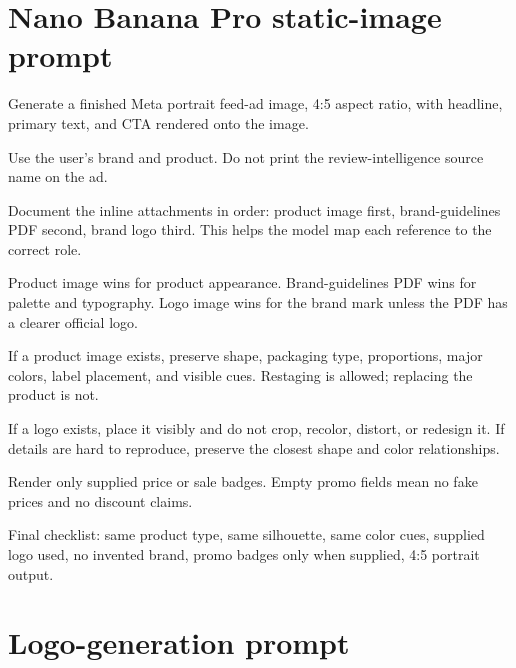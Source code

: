 \documentclass[12pt,a4paper]{report}
\begin{document}
\section{Nano Banana Pro static-image prompt}
\label{sec:imgprompt}

\begin{description}[style=nextline, leftmargin=2cm, labelwidth=1.8cm]
  \item[\textsc{task}] Generate a finished Meta portrait feed-ad image, 4:5 aspect ratio, with headline, primary text, and CTA rendered onto the image.
  \item[\textsc{identity}] Use the user's brand and product. Do not print the review-intelligence source name on the ad.
  \item[\textsc{attachment order}] Document the inline attachments in order: product image first, brand-guidelines PDF second, brand logo third. This helps the model map each reference to the correct role.
  \item[\textsc{reference priority}] Product image wins for product appearance. Brand-guidelines PDF wins for palette and typography. Logo image wins for the brand mark unless the PDF has a clearer official logo.
  \item[\textsc{product fidelity}] If a product image exists, preserve shape, packaging type, proportions, major colors, label placement, and visible cues. Restaging is allowed; replacing the product is not.
  \item[\textsc{brand fidelity}] If a logo exists, place it visibly and do not crop, recolor, distort, or redesign it. If details are hard to reproduce, preserve the closest shape and color relationships.
  \item[\textsc{promo badges}] Render only supplied price or sale badges. Empty promo fields mean no fake prices and no discount claims.
  \item[\textsc{checklist}] Final checklist: same product type, same silhouette, same color cues, supplied logo used, no invented brand, promo badges only when supplied, 4:5 portrait output.
\end{description}

\section{Logo-generation prompt}
\label{sec:logoprompt}
\end{document}
